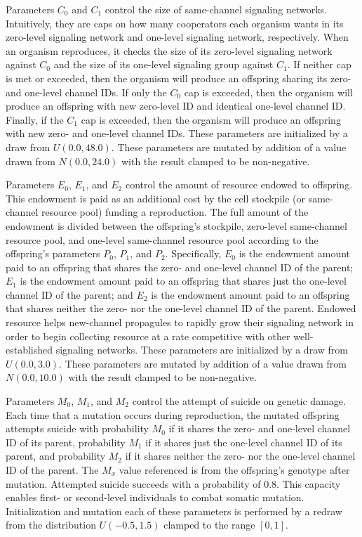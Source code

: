 Parameters $C_0$ and $C_1$ control the size of same-channel signaling networks.
Intuitively, they are caps on how many cooperators each organism wants in its zero-level signaling network and one-level signaling network, respectively.
When an organism reproduces, it checks the size of its zero-level signaling network against $C_0$ and the size of its one-level signaling group against $C_1$.
If neither cap is met or exceeded, then the organism will produce an offspring sharing its zero- and one-level channel IDs.
If only the $C_0$ cap is exceeded, then the organism will produce an offspring with new zero-level ID and identical one-level channel ID.
Finally, if the $C_1$ cap is exceeded, then the organism will produce an offspring with new zero- and one-level channel IDs.
These parameters are initialized by a draw from $U(0.0, 48.0)$.
These parameters are mutated by addition of a value drawn from $N(0.0,24.0)$ with the result clamped to be non-negative.

Parameters $E_0$, $E_1$, and $E_2$ control the amount of resource endowed to offspring.
This endowment is paid as an additional cost by the cell stockpile (or same-channel resource pool) funding a reproduction.
The full amount of the endowment is divided between the offspring's stockpile, zero-level same-channel resource pool, and one-level same-channel resource pool according to the offspring's parameters $P_0$, $P_1$, and $P_2$.
Specifically, $E_0$ is the endowment amount paid to an offspring that shares the zero- and one-level channel ID of the parent;
$E_1$ is the endowment amount paid to an offspring that shares just the one-level channel ID of the parent;
and $E_2$ is the endowment amount paid to an offspring that shares neither the zero- nor the one-level channel ID of the parent.
Endowed resource helps new-channel propagules to rapidly grow their signaling network in order to begin collecting resource at a rate competitive with other well-established signaling networks.
These parameters are initialized by a draw from $U(0.0, 3.0)$.
These parameters are mutated by addition of a value drawn from $N(0.0,10.0)$ with the result clamped to be non-negative.

Parameters $M_0$, $M_1$, and $M_2$ control the attempt of suicide on genetic damage.
Each time that a mutation occurs during reproduction, the mutated offspring attempts suicide with probability $M_0$ if it shares the zero- and one-level channel ID of its parent, probability $M_1$ if it shares just the one-level channel ID of its parent, and probability $M_2$ if it shares neither the zero- nor the one-level channel ID of the parent.
The $M_x$ value referenced is from the offspring's genotype after mutation.
Attempted suicide succeeds with a probability of $0.8$.
This capacity enables first- or second-level individuals to combat somatic mutation.
Initialization and mutation each of these parameters is performed by a redraw from the distribution $U(-0.5,1.5)$ clamped to the range $[0,1]$.

